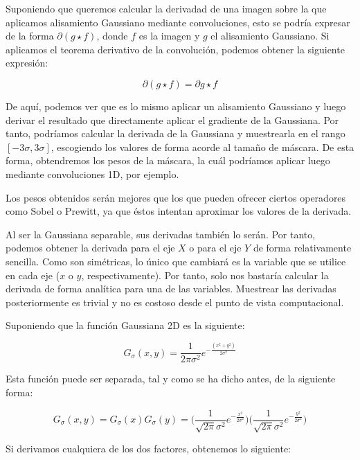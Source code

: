 \documentclass[11pt,a4paper]{article}
\begin{document}
Suponiendo que queremos calcular la derivadad de una imagen sobre la que aplicamos alisamiento Gaussiano mediante
convoluciones, esto se podría expresar de la forma $\partial(g \star f)$, donde $f$ es la imagen y $g$ el alisamiento
Gaussiano. Si aplicamos el teorema derivativo de la convolución, podemos obtener la siguiente expresión:

\begin{equation}
	\partial(g \star f) = \partial g \star f
\end{equation}

De aquí, podemos ver que es lo mismo aplicar un alisamiento Gaussiano y luego derivar el resultado que directamente aplicar
el gradiente de la Gaussiana. Por tanto, podríamos calcular la derivada de la Gaussiana y muestrearla en el rango
$[-3\sigma, 3\sigma]$, escogiendo los valores de forma acorde al tamaño de máscara. De esta forma, obtendremos los pesos
de la máscara, la cuál podríamos aplicar luego mediante convoluciones 1D, por ejemplo.

Los pesos obtenidos serán mejores que los que pueden ofrecer ciertos operadores como Sobel o Prewitt, ya que éstos intentan
aproximar los valores de la derivada.

Al ser la Gaussiana separable, sus derivadas también lo serán. Por tanto, podemos obtener la derivada para el eje $X$ o para
el eje $Y$ de forma relativamente sencilla. Como son simétricas, lo único que cambiará es la variable que se utilice en cada
eje ($x$ o $y$, respectivamente). Por tanto, solo nos bastaría calcular la derivada de forma analítica para una de las variables.
Muestrear las derivadas posteriormente es trivial y no es costoso desde el punto de vista computacional.

Suponiendo que la función Gaussiana 2D es la siguiente:

\begin{equation}
	G_\sigma(x, y) = \frac{1}{2\pi\sigma^2}e^{-\frac{(x^2 + y^2)}{2\sigma^2}}
\end{equation}

Esta función puede ser separada, tal y como se ha dicho antes, de la siguiente forma:

\begin{equation}
\label{eq:gauss-desc}
	G_\sigma(x, y) = G_\sigma(x) G_\sigma(y) = \bigg(\frac{1}{\sqrt{2\pi}\sigma^2}e^{-\frac{x^2}{2\sigma^2}}\bigg)
	\bigg(\frac{1}{\sqrt{2\pi}\sigma^2}e^{-\frac{y^2}{2\sigma^2}}\bigg)
\end{equation}

Si derivamos cualquiera de los dos factores, obtenemos lo siguiente:
\end{document}

